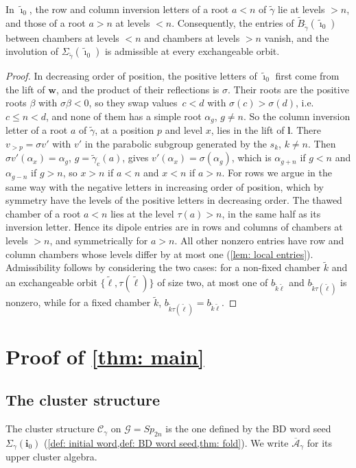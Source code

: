 \documentclass[a4paper]{amsart}
\numberwithin{equation}{section}
\theoremstyle{definition}
\theoremstyle{remark}
\newcommand{\mcG}{\mathcal{G}}
\newcommand{\mcC}{\mathcal{C}}
\newcommand{\oA}{\overline{\mathcal{A}}}
\newcommand{\bfi}{\mathbf{i}}
\newcommand{\tbfi}{\widetilde{\boldsymbol{\imath}}}
\newcommand{\tB}{\widetilde{B}}
\newcommand{\tg}{\widetilde{\gamma}}
\newcommand{\cc}{\mathrm{c}}
\newcommand{\Sp}{Sp_{2n}}
\begin{document}
\begin{lemma}
  \label{lem: halves}
  In $\tbfi_0$, the row and column inversion letters of a root $a<n$ of $\tg$ lie at levels $>n$, and those of a root $a>n$ at levels $<n$.
  Consequently, the entries of $\tB_{\tg}(\tbfi_0)$ between chambers at levels $<n$ and chambers at levels $>n$ vanish, and the involution of $\Sigma_{\tg}(\tbfi_0)$ is admissible at every exchangeable orbit.
\end{lemma}
\begin{proof}
  In decreasing order of position, the positive letters of $\tbfi_0$ first come from the lift of $\mathbf w$, and the product of their reflections is $\sigma$.
  Their roots are the positive roots $\beta$ with $\sigma\beta<0$, so they swap values~$c<d$ with $\sigma(c)>\sigma(d)$, i.e.\ $c\le n<d$, and none of them has a simple root $\alpha_g$, $g\neq n$.
  So the column inversion letter of a root $a$ of $\tg$, at a position $p$ and level $x$, lies in the lift of $\mathbf l$.
  There $v_{>p}=\sigma v'$ with $v'$ in the parabolic subgroup generated by the $s_k$, $k\neq n$.
  Then $\sigma v'(\alpha_x)=\alpha_g$, $g=\tg_{\cc}(a)$, gives $v'(\alpha_x)=\sigma(\alpha_g)$, which is $\alpha_{g+n}$ if $g<n$ and $\alpha_{g-n}$ if $g>n$, so $x>n$ if $a<n$ and $x<n$ if $a>n$.
  For rows we argue in the same way with the negative letters in increasing order of position, which by symmetry have the levels of the positive letters in decreasing order.
  The thawed chamber of a root $a<n$ lies at the level $\tau(a)>n$, in the same half as its inversion letter.
  Hence its dipole entries are in rows and columns of chambers at levels $>n$, and symmetrically for $a>n$.
  All other nonzero entries have row and column chambers whose levels differ by at most one (\cref{lem: local entries}).
  Admissibility follows by considering the two cases: for a non-fixed chamber $\widetilde{k}$ and an exchangeable orbit $\{\widetilde{\ell},\tau(\widetilde{\ell})\}$ of size two, at most one of $b_{\widetilde{k}\widetilde{\ell}}$ and $b_{\widetilde{k}\tau(\widetilde{\ell})}$ is nonzero, while for a fixed chamber $\widetilde{k}$, $b_{\widetilde{k}\tau(\widetilde{\ell})}=b_{\widetilde{k}\widetilde{\ell}}$.
\end{proof}

\section{Proof of \texorpdfstring{\cref{thm: main}}{the main theorem}}
\label{sec: main}
\subsection{The cluster structure}
\begin{definition}
  \label{def: C gamma}
  The cluster structure $\mcC_\gamma$ on $\mcG=\Sp$ is the one defined by the BD word seed $\Sigma_\gamma(\bfi_0)$ (\cref{def: initial word,def: BD word seed,thm: fold}).
  We write $\oA_\gamma$ for its upper cluster algebra.
\end{definition}
\end{document}

